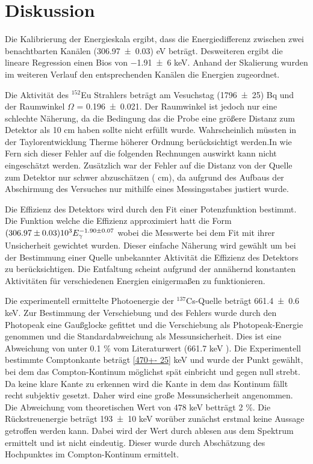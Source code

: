 \section{Diskussion}
\label{sec:Diskussion}
Die Kalibrierung der Energieskala ergibt, dass die Energiedifferenz zwischen zwei benachtbarten Kanälen (\num{306.97 +- 0.03}) eV beträgt. Desweiteren ergibt die lineare Regression einen Bios von \num{-1.91 +- 6} keV. Anhand der Skalierung wurden im weiteren Verlauf den entsprechenden Kanälen die Energien zugeordnet. 

Die Aktivität des $^{152}$Eu Strahlers beträgt am Vesuchstag (\num{1796 +- 25}) Bq und der Raumwinkel $\Omega$ = \num{0.196 +- 0.021}. Der Raumwinkel ist jedoch nur eine schlechte Näherung, da die Bedingung das die Probe eine größere Distanz zum Detektor als 10 cm haben sollte nicht erfüllt wurde. Wahrscheinlich müssten in der Taylorentwicklung Therme höherer Ordnung berücksichtigt werden.In wie Fern sich dieser Fehler auf die folgenden Rechnungen auswirkt kann nicht eingeschätzt werden. Zusätzlich war der Fehler auf die Distanz von der Quelle zum Detektor nur schwer abzuschätzen ( cm), da aufgrund des Aufbaus der Abschirmung des Versuches nur mithilfe eines Messingsstabes justiert wurde. 

Die Effizienz des Detektors wird durch den Fit einer Potenzfunktion bestimmt. Die Funktion welche die Effizienz approximiert hatt die Form $(\num{306.97 +- 0.03})10^3 E_\gamma^{\num{-1.90 +- 0.07}}$ wobei die Messwerte bei dem Fit mit ihrer Unsicherheit gewichtet wurden. Dieser einfache Näherung wird gewählt um bei der Bestimmung einer Quelle unbekannter Aktivität die Effizienz des Detektors zu berücksichtigen. Die Entfaltung scheint aufgrund der annähernd konstanten Aktivitäten für verschiedenen Energien einigermaßen zu funktionieren.  

Die experimentell ermittelte Photoenergie der $^{137}$Cs-Quelle beträgt \num{661.4 +- 0.6} keV. Zur Bestimmung der Verschiebung und des Fehlers wurde durch den Photopeak eine Gaußglocke gefittet und die Verschiebung als Photopeak-Energie genommen und die Standardabweichung als Messunsicherheit. Dies ist eine Abweichung von unter 0.1 \% vom Literaturwert (661.7 keV \cite{Cs}). Die Experimentell bestimmte Comptonkante beträgt \ref{470+- 25} keV und wurde der Punkt gewählt, bei dem das Compton-Kontinum möglichst spät einbricht und gegen null strebt. Da keine klare Kante zu erkennen wird die Kante in dem das Kontinum fällt recht subjektiv gesetzt. Daher wird eine große Messunsicherheit angenommen. Die Abweichung vom theoretischen Wert von 478 keV betträgt 2 \%. Die Rückstreuenergie beträgt \num{193+- 10} keV worüber zunächst erstmal keine Aussage getroffen werden kann. Dabei wird der Wert durch ablesen aus dem Spektrum ermittelt und ist nicht eindeutig. Dieser wurde durch Abschätzung des Hochpunktes im Compton-Kontinum ermittelt. 

